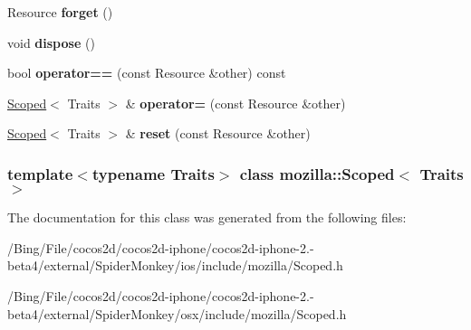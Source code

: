 \begin{DoxyCompactItemize}
\item 
\hypertarget{classmozilla_1_1_scoped_a8e0297c73f06fa38b9559b83bbe426d3}{Resource {\bfseries forget} ()}\label{classmozilla_1_1_scoped_a8e0297c73f06fa38b9559b83bbe426d3}

\item 
\hypertarget{classmozilla_1_1_scoped_a15de165b74aeae8d2c33d5a19198937b}{void {\bfseries dispose} ()}\label{classmozilla_1_1_scoped_a15de165b74aeae8d2c33d5a19198937b}

\item 
\hypertarget{classmozilla_1_1_scoped_a7030efe727cc35d0b3a2c7bf19e996a3}{bool {\bfseries operator==} (const Resource \&other) const }\label{classmozilla_1_1_scoped_a7030efe727cc35d0b3a2c7bf19e996a3}

\item 
\hypertarget{classmozilla_1_1_scoped_a06ffec76adbfefad7d618be78690eb91}{\hyperlink{classmozilla_1_1_scoped}{Scoped}$<$ Traits $>$ \& {\bfseries operator=} (const Resource \&other)}\label{classmozilla_1_1_scoped_a06ffec76adbfefad7d618be78690eb91}

\item 
\hypertarget{classmozilla_1_1_scoped_a80fc9ba7d29914e5b46cd833da4f1b4e}{\hyperlink{classmozilla_1_1_scoped}{Scoped}$<$ Traits $>$ \& {\bfseries reset} (const Resource \&other)}\label{classmozilla_1_1_scoped_a80fc9ba7d29914e5b46cd833da4f1b4e}

\end{DoxyCompactItemize}
\subsubsection*{template$<$typename Traits$>$ class mozilla\-::\-Scoped$<$ Traits $>$}



The documentation for this class was generated from the following files\-:\begin{DoxyCompactItemize}
\item 
/\-Bing/\-File/cocos2d/cocos2d-\/iphone/cocos2d-\/iphone-\/2.-\/beta4/external/\-Spider\-Monkey/ios/include/mozilla/Scoped.\-h\item 
/\-Bing/\-File/cocos2d/cocos2d-\/iphone/cocos2d-\/iphone-\/2.-\/beta4/external/\-Spider\-Monkey/osx/include/mozilla/Scoped.\-h\end{DoxyCompactItemize}
